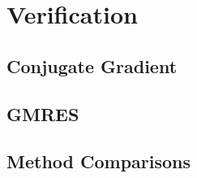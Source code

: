 \documentclass[12pt]{memoir}
\begin{document}
 
 \chapter{Verification}
 
 \section{Conjugate Gradient}
 
 \section{GMRES}
 
 \section{Method Comparisons}
 
 
\end{document}
